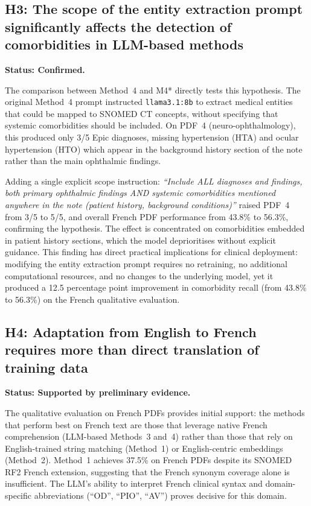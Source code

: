 \subsection*{H3: The scope of the entity extraction prompt significantly affects the detection of comorbidities in LLM-based methods}

\textbf{Status: Confirmed.}

The comparison between Method~4 and M4* directly tests this hypothesis. The original Method~4 prompt instructed \texttt{llama3.1:8b} to extract medical entities that could be mapped to SNOMED CT concepts, without specifying that systemic comorbidities should be included. On PDF~4 (neuro-ophthalmology), this produced only 3/5 Epic diagnoses, missing hypertension (HTA) and ocular hypertension (HTO) which appear in the background history section of the note rather than the main ophthalmic findings.

Adding a single explicit scope instruction: \textit{``Include ALL diagnoses and findings, both primary ophthalmic findings AND systemic comorbidities mentioned anywhere in the note (patient history, background conditions)''} raised PDF~4 from 3/5 to 5/5, and overall French PDF performance from 43.8\% to 56.3\%, confirming the hypothesis. The effect is concentrated on comorbidities embedded in patient history sections, which the model deprioritises without explicit guidance. This finding has direct practical implications for clinical deployment: modifying the entity extraction prompt requires no retraining, no additional computational resources, and no changes to the underlying model, yet it produced a 12.5 percentage point improvement in comorbidity recall (from 43.8\% to 56.3\%) on the French qualitative evaluation.

\subsection*{H4: Adaptation from English to French requires more than direct translation of training data}

\textbf{Status: Supported by preliminary evidence.}

The qualitative evaluation on French PDFs provides initial support: the methods that perform best on French text are those that leverage native French comprehension (LLM-based Methods~3 and~4) rather than those that rely on English-trained string matching (Method~1) or English-centric embeddings (Method~2). Method~1 achieves 37.5\% on French PDFs despite its SNOMED RF2 French extension, suggesting that the French synonym coverage alone is insufficient. The LLM's ability to interpret French clinical syntax and domain-specific abbreviations (``OD'', ``PIO'', ``AV'') proves decisive for this domain.

